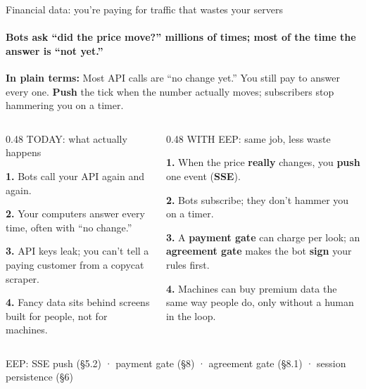 \documentclass[aspectratio=169,10pt]{beamer}
\begin{document}
\begin{frame}{Financial data: you're paying for traffic that wastes your servers}
\framesubtitle{Bots ask ``did the price move?'' millions of times; most of the time the answer is ``not yet.''}

\vspace{0.06cm}
{\small\color{amber}\textbf{In plain terms:}\; Most API calls are ``no change yet.'' You still pay to answer every one. \textbf{Push} the tick when the number actually moves; subscribers stop hammering you on a timer.}

\vspace{0.1cm}
\begin{columns}[T]
\begin{column}{0.48\textwidth}
{\small\color{rose} TODAY: what actually happens}\par
\vspace{2pt}
{\small\color{txtm}%
\textbf{1.}\; Bots call your API again and again.\par
\textbf{2.}\; Your computers answer every time, often with ``no change.''\par
\textbf{3.}\; API keys leak; you can't tell a paying customer from a copycat scraper.\par
\textbf{4.}\; Fancy data sits behind screens built for people, not for machines.\par
}
\end{column}

\begin{column}{0.48\textwidth}
{\small\color{mint} WITH EEP: same job, less waste}\par
\vspace{2pt}
{\small\color{txtm}%
\textbf{1.}\; When the price \textbf{really} changes, you \textbf{push} one event (\textbf{SSE}).\par
\textbf{2.}\; Bots subscribe; they don't hammer you on a timer.\par
\textbf{3.}\; A \textbf{payment gate} can charge per look; an \textbf{agreement gate} makes the bot \textbf{sign} your rules first.\par
\textbf{4.}\; Machines can buy premium data the same way people do, only without a human in the loop.\par
}
\end{column}
\end{columns}

\vspace{4pt}
{\footnotesize\color{slate} EEP: SSE push (§5.2) · payment gate (§8) · agreement gate (§8.1) · session persistence (§6)}
\end{frame}
\end{document}
